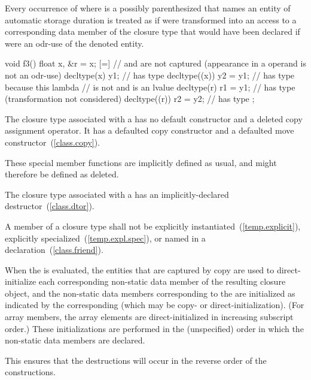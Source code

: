 \pnum
Every occurrence of  where  is a possibly
parenthesized  that names an entity of automatic storage
duration is treated as if  were transformed into an access to a corresponding
data member of the closure type that would have been declared if  were an odr-use of
the denoted entity. \begin{example}

\begin{codeblock}
void f3() {
  float x, &r = x;
  [=] {                     //  and  are not captured (appearance in a  operand is not an odr-use)
    decltype(x) y1;         //  has type 
    decltype((x)) y2 = y1;  //  has type  because this lambda
                            // is not  and  is an lvalue
    decltype(r) r1 = y1;    //  has type  (transformation not considered)
    decltype((r)) r2 = y2;  //  has type 
  };
}
\end{codeblock}
\end{example}

\pnum
The closure type associated with a  has no
default constructor and a deleted copy assignment operator. It has a
defaulted copy constructor and a defaulted move constructor~(\ref{class.copy}).
\begin{note} These special member functions are implicitly defined as
usual, and might therefore be defined as deleted. \end{note}

\pnum
The closure type associated with a  has an
implicitly-declared destructor~(\ref{class.dtor}).

\pnum
A member of a closure type shall not be
explicitly instantiated~(\ref{temp.explicit}),
explicitly specialized~(\ref{temp.expl.spec}), or
named in a  declaration~(\ref{class.friend}).

\pnum
When the  is evaluated, the entities that are
captured by copy are used to direct-initialize each corresponding non-static data member
of the resulting closure object, and the non-static data members corresponding to the
 are initialized as indicated by the corresponding
 (which may be copy- or direct-initialization). (For array members, the array elements are
direct-initialized in increasing subscript order.) These initializations are performed
in the (unspecified) order in which the non-static data members are declared. \begin{note}
This ensures that the destructions will occur in the reverse order of the constructions.
\end{note}

